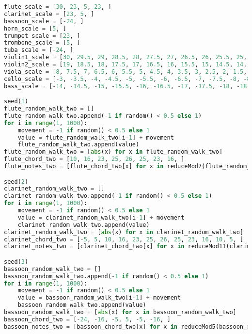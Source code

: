 \begin{lstlisting}[language=Python, caption=Tianshu Segment\_I]
flute_scale = [30, 23, 5, 23, ]
clarinet_scale = [23, 5, ]
bassoon_scale = [-24, ]
horn_scale = [5, ]
trumpet_scale = [23, ]
trombone_scale = [5, ]
tuba_scale = [-24, ]
violin1_scale = [30, 29.5, 29, 28.5, 28, 27.5, 27, 26.5, 26, 25.5, 25, 24.5, 24, 23.5, 23, 22.5, 22, 21.5, 21, 20.5, 20, 19.5, 19, 19.5, 20, 20.5, 21, 21.5, 22, 22.5, 23, 23.5, 24, 24.5, 25, 25.5, 26, 26.5, 27, 27.5, 28, 28.5, 29, 29.5, ]
violin2_scale = [19, 18.5, 18, 17.5, 17, 16.5, 16, 15.5, 15, 14.5, 14, 13.5, 13, 12.5, 12, 11.5, 11, 10.5, 10, 9.5, 9, 8.5, 8, 8.5, 9, 9.5, 10, 10.5, 11, 11.5, 12, 12.5, 13, 13.5, 14, 14.5, 15, 15.5, 16, 16.5, 17, 17.5, 18, 18.5, ]
viola_scale = [8, 7.5, 7, 6.5, 6, 5.5, 5, 4.5, 4, 3.5, 3, 2.5, 2, 1.5, 1, 0.5, 0, -0.5, -1, -1.5, -2, -2.5, -3, -2.5, -2, -1.5, -1, -0.5, 0, 0.5, 1, 1.5, 2, 2.5, 3, 3.5, 4, 4.5, 5, 5.5, 6, 6.5, 7, 7.5, ]
cello_scale = [-3, -3.5, -4, -4.5, -5, -5.5, -6, -6.5, -7, -7.5, -8, -8.5, -9, -9.5, -10, -10.5, -11, -11.5, -12, -12.5 -13, -13.5 -14, -13.5, -13, -12.5, -12, -11.5, -11, -10.5, -10, -9.5, -9, -8.5, -8, -7.5, -7, -6.5, -6, -5.5, -5, -4.5, -4, -3.5, ]
bass_scale = [-14, -14.5, -15, -15.5, -16, -16.5, -17, -17.5, -18, -18.5, -19, -19.5, -20, -20.5, -21, -21.5, -22, -22.5, -23, -23.5, -24, -24.5, -25, -24.5, -24, -23.5, -23, -22.5, -22, -21.5, -21, -20.5, -20, -19.5, -19, -18.5, -18, -17.5, -17, -16.5, -16, -15.5, -15, -14.5, ]

seed(1)
flute_random_walk_two = []
flute_random_walk_two.append(-1 if random() < 0.5 else 1)
for i in range(1, 1000):
    movement = -1 if random() < 0.5 else 1
    value = flute_random_walk_two[i-1] + movement
    flute_random_walk_two.append(value)
flute_random_walk_two = [abs(x) for x in flute_random_walk_two]
flute_chord_two = [10, 16, 23, 25, 26, 25, 23, 16, ]
flute_notes_two = [flute_chord_two[x] for x in reduceMod7(flute_random_walk_two)]

seed(2)
clarinet_random_walk_two = []
clarinet_random_walk_two.append(-1 if random() < 0.5 else 1)
for i in range(1, 1000):
    movement = -1 if random() < 0.5 else 1
    value = clarinet_random_walk_two[i-1] + movement
    clarinet_random_walk_two.append(value)
clarinet_random_walk_two = [abs(x) for x in clarinet_random_walk_two]
clarinet_chord_two = [-5, 5, 10, 16, 23, 25, 26, 25, 23, 16, 10, 5, ]
clarinet_notes_two = [clarinet_chord_two[x] for x in reduceMod11(clarinet_random_walk_two)]

seed(3)
bassoon_random_walk_two = []
bassoon_random_walk_two.append(-1 if random() < 0.5 else 1)
for i in range(1, 1000):
    movement = -1 if random() < 0.5 else 1
    value = bassoon_random_walk_two[i-1] + movement
    bassoon_random_walk_two.append(value)
bassoon_random_walk_two = [abs(x) for x in bassoon_random_walk_two]
bassoon_chord_two = [-24, -16, -5, 5, -5, -16, ]
bassoon_notes_two = [bassoon_chord_two[x] for x in reduceMod5(bassoon_random_walk_two)]


\end{lstlisting}
